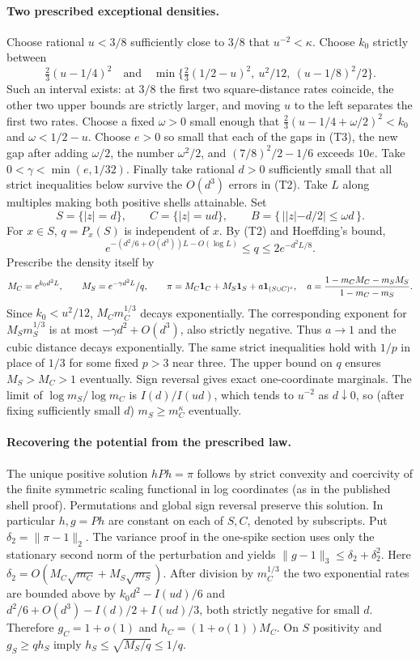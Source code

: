 \paragraph{Two prescribed exceptional densities.}
Choose rational $u<3/8$ sufficiently close to $3/8$ that
$u^{-2}<\kappa$. Choose $k_0$ strictly between
\[
 \tfrac23(u-1/4)^2
 \quad\text{and}\quad
 \min\{\tfrac23(1/2-u)^2,\ u^2/12,\ (u-1/8)^2/2\}.
 \tag{T3}
\]
Such an interval exists: at $3/8$ the first two square-distance
rates coincide, the other two upper bounds are strictly larger,
and moving $u$ to the left separates the first two rates.
Choose a fixed $\omega>0$ small enough that
$\tfrac23(u-1/4+\omega/2)^2<k_0$ and $\omega<1/2-u$.
Choose $e>0$ so small that each of the gaps in (T3), the new gap
after adding $\omega/2$, the number $\omega^2/2$, and
$(7/8)^2/2-1/6$ exceeds $10e$. Take $0<\gamma<\min(e,1/32)$.
Finally take rational $d>0$ sufficiently small that all strict
inequalities below survive the $O(d^3)$ errors in (T2). Take $L$
along multiples making both positive shells attainable. Set
\[
 S=\{|z|=d\},\qquad C=\{|z|=ud\},\qquad
 B=\{\,||z|-d/2|\le\omega d\,\}.
\]
For $x\in S$, $q=P_x(S)$ is independent of $x$. By (T2) and
Hoeffding's bound,
\[
 e^{-(d^2/6+O(d^3))L-O(\log L)}\le q\le2e^{-d^2L/8}.
\]
Prescribe the density itself by
\[
 M_C=e^{k_0 d^2 L},\qquad M_S=e^{-\gamma d^2L}/q,\qquad
 \pi=M_C{\bf1}_C+M_S{\bf1}_S+a{\bf1}_{(S\cup C)^c},
 \quad a=\frac{1-m_C M_C-m_S M_S}{1-m_C-m_S}.
\]
Since $k_0<u^2/12$, $M_Cm_C^{1/3}$ decays exponentially. The
corresponding exponent for $M_Sm_S^{1/3}$ is at most
$-\gamma d^2+O(d^3)$, also strictly negative. Thus $a\to1$ and the
cubic distance decays exponentially. The same strict inequalities
hold with $1/p$ in place of $1/3$ for some fixed $p>3$ near three.
The upper bound on $q$ ensures $M_S>M_C>1$ eventually. Sign reversal
gives exact one-coordinate marginals. The limit of $\log m_S/\log m_C$
is $I(d)/I(ud)$, which tends to $u^{-2}$ as $d\downarrow0$, so (after
fixing sufficiently small $d$) $m_S\ge m_C^\kappa$ eventually.

\paragraph{Recovering the potential from the prescribed law.}
The unique positive solution $hPh=\pi$ follows by strict convexity
and coercivity of the finite symmetric scaling functional in log
coordinates (as in the published shell proof). Permutations and global
sign reversal preserve this solution. In particular $h,g=Ph$ are
constant on each of $S,C$, denoted by subscripts. Put
$\delta_2=\|\pi-1\|_2$. The variance proof in the one-spike section
uses only the stationary second norm of the perturbation and yields
$\|g-1\|_3\le\delta_2+\delta_2^2$. Here
$\delta_2=O(M_C\sqrt{m_C}+M_S\sqrt{m_S})$.
After division by $m_C^{1/3}$ the two exponential rates are bounded
above by $k_0d^2-I(ud)/6$ and
$d^2/6+O(d^3)-I(d)/2+I(ud)/3$, both strictly negative for small $d$.
Therefore $g_C=1+o(1)$ and $h_C=(1+o(1))M_C$.
On $S$ positivity and $g_S\ge qh_S$ imply
$h_S\le\sqrt{M_S/q}\le1/q$.

